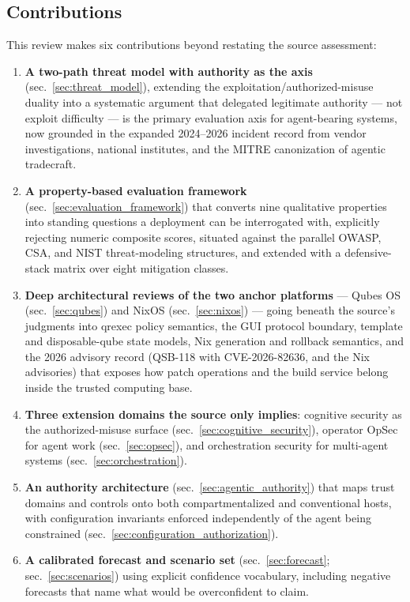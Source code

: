 \documentclass[
  english,
  9pt,
]{extarticle}
\providecommand{\tightlist}{%
  \setlength{\itemsep}{0pt}\setlength{\parskip}{0pt}}
\begin{document}
\subsection{Contributions}\label{contributions}

This review makes six contributions beyond restating the source
assessment:

\begin{enumerate}
\def\labelenumi{\arabic{enumi}.}
\tightlist
\item
  \textbf{A two-path threat model with authority as the axis}
  (sec.~\ref{sec:threat_model}), extending the
  exploitation/authorized-misuse duality into a systematic argument that
  delegated legitimate authority --- not exploit difficulty --- is the
  primary evaluation axis for agent-bearing systems, now grounded in the
  expanded 2024--2026 incident record from vendor investigations,
  national institutes, and the MITRE canonization of agentic tradecraft.
\item
  \textbf{A property-based evaluation framework}
  (sec.~\ref{sec:evaluation_framework}) that converts nine qualitative
  properties into standing questions a deployment can be interrogated
  with, explicitly rejecting numeric composite scores, situated against
  the parallel OWASP, CSA, and NIST threat-modeling structures, and
  extended with a defensive-stack matrix over eight mitigation classes.
\item
  \textbf{Deep architectural reviews of the two anchor platforms} ---
  Qubes OS (sec.~\ref{sec:qubes}) and NixOS (sec.~\ref{sec:nixos}) ---
  going beneath the source's judgments into qrexec policy semantics, the
  GUI protocol boundary, template and disposable-qube state models, Nix
  generation and rollback semantics, and the 2026 advisory record
  (QSB-118 with CVE-2026-82636, and the Nix advisories) that exposes how
  patch operations and the build service belong inside the trusted
  computing base.
\item
  \textbf{Three extension domains the source only implies}: cognitive
  security as the authorized-misuse surface
  (sec.~\ref{sec:cognitive_security}), operator OpSec for agent work
  (sec.~\ref{sec:opsec}), and orchestration security for multi-agent
  systems (sec.~\ref{sec:orchestration}).
\item
  \textbf{An authority architecture} (sec.~\ref{sec:agentic_authority})
  that maps trust domains and controls onto both compartmentalized and
  conventional hosts, with configuration invariants enforced
  independently of the agent being constrained
  (sec.~\ref{sec:configuration_authorization}).
\item
  \textbf{A calibrated forecast and scenario set}
  (sec.~\ref{sec:forecast}; sec.~\ref{sec:scenarios}) using explicit
  confidence vocabulary, including negative forecasts that name what
  would be overconfident to claim.
\end{enumerate}
\end{document}
